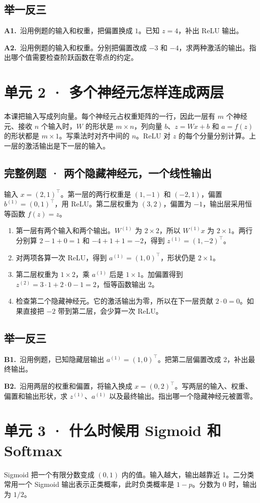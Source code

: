 \documentclass[UTF8,a4paper,11pt]{ctexart}
\newcommand{\PracticeQuestion}[3]{\par\Needspace{4\baselineskip}\noindent\begin{minipage}{\linewidth}\textbf{#1.}\ #2\par\noindent\rule{0pt}{#3mm}\par\end{minipage}\par}
\begin{document}
\subsection{举一反三}
\PracticeQuestion{A1}{沿用例题的输入和权重，把偏置换成 $1$。已知 $z=4$，补出 ReLU 输出。}{23}
\PracticeQuestion{A2}{沿用例题的输入和权重。分别把偏置改成 $-3$ 和 $-4$，求两种激活的输出。指出哪个值需要检查阶跃函数在零点的约定。}{26}
\clearpage
\section{单元 2 · 多个神经元怎样连成两层}
本课把输入写成列向量。每个神经元占权重矩阵的一行，因此一层有 $m$ 个神经元、接收 $n$ 个输入时，$W$ 的形状是 $m\times n$，列向量 $b$、$z=Wx+b$ 和 $a=f(z)$ 的形状都是 $m\times1$。写乘法时对齐中间的 $n$。ReLU 对 $z$ 的每个分量分别计算。上一层的激活输出是下一层的输入。

\subsection{完整例题 · 两个隐藏神经元，一个线性输出}
输入 $x=(2,1)^\top$。第一层的两行权重是 $(1,-1)$ 和 $(-2,1)$，偏置 $b^{(1)}=(0,1)^\top$，用 ReLU。第二层权重为 $(3,2)$，偏置为 $-1$，输出层采用恒等函数 $f(z)=z$。

\begin{enumerate}
\item 第一层有两个输入和两个输出。$W^{(1)}$ 为 $2\times2$，所以 $W^{(1)}x$ 为 $2\times1$。两行分别算 $2-1+0=1$ 和 $-4+1+1=-2$，得到 $z^{(1)}=(1,-2)^\top$。
\item 对两项各算一次 ReLU，得到 $a^{(1)}=(1,0)^\top$，形状仍是 $2\times1$。
\item 第二层权重为 $1\times2$，乘 $a^{(1)}$ 后是 $1\times1$。加偏置得到 $z^{(2)}=3\cdot1+2\cdot0-1=2$，恒等函数输出 2。
\item 检查第二个隐藏神经元。它的激活输出为零，所以在下一层贡献 $2\cdot0=0$。如果直接把 $-2$ 带到第二层，会少算一次 ReLU。
\end{enumerate}
\subsection{举一反三}
\PracticeQuestion{B1}{沿用例题，已知隐藏层输出 $a^{(1)}=(1,0)^\top$。把第二层偏置改成 $2$，补出最终输出。}{24}
\PracticeQuestion{B2}{沿用两层的权重和偏置，将输入换成 $x=(0,2)^\top$。写两层的输入、权重、偏置和输出形状，求 $z^{(1)}$、$a^{(1)}$ 以及最终输出。指出哪一个隐藏神经元被置零。}{34}
\clearpage
\section{单元 3 · 什么时候用 Sigmoid 和 Softmax}
Sigmoid 把一个有限分数变成 $(0,1)$ 内的值。输入越大，输出越靠近 1。二分类常用一个 Sigmoid 输出表示正类概率，此时负类概率是 $1-p$。分数为 0 时，输出为 $1/2$。
\end{document}
